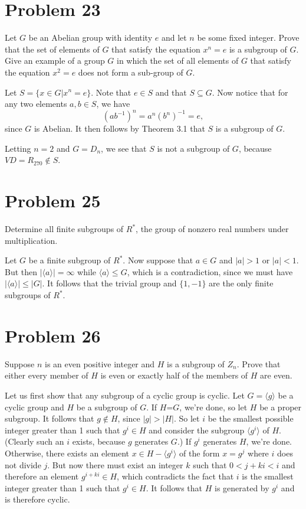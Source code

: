 \documentclass[12pt]{article}
\begin{document}
\section*{Problem 23}

Let $G$ be an Abelian group with identity $e$ and let $n$ be some fixed integer.
Prove that the set of elements of $G$ that satisfy the equation $x^n=e$
is a subgroup of $G$.  Give an example of a group $G$ in which the set
of all elements of $G$ that satisfy the equation $x^2=e$ does not form a sub-group of $G$.

Let $S=\{x\in G|x^n=e\}$.  Note that $e\in S$ and that $S\subseteq G$.
Now notice that for any two elements $a,b\in S$, we have
\begin{equation*}
(ab^{-1})^n = a^n(b^n)^{-1} = e,
\end{equation*}
since $G$ is Abelian.  It then follows by Theorem 3.1 that $S$ is a subgroup of $G$.

Letting $n=2$ and $G=D_n$, we see that $S$ is not a subgroup of $G$,
because $VD=R_{270}\not\in S$.

\section*{Problem 25}

Determine all finite subgroups of $R^*$, the group of nonzero real numbers under multiplication.

Let $G$ be a finite subgroup of $R^*$.  Now suppose that $a\in G$ and $|a|>1$ or $|a|<1$.
But then $|\langle a\rangle|=\infty$ while $\langle a\rangle\leq G$, which is a contradiction,
since we must have $|\langle a\rangle|\leq|G|$.
It follows that the trivial group and $\{1,-1\}$ are the only finite subgroups of $R^*$.

\section*{Problem 26}

Suppose $n$ is an even positive integer and $H$ is a subgroup of $Z_n$.  Prove
that either every member of $H$ is even or exactly half of the members of $H$ are even.

Let us first show that any subgroup of a cyclic group is cyclic.
Let $G=\langle g\rangle$ be a cyclic group and $H$ be a subgroup
of $G$.  If $H$=$G$, we're done, so let $H$ be a proper subgroup.
It follows that $g\not\in H$, since $|g|>|H|$.
So let $i$ be the smallest possible integer greater than 1 such that
$g^i\in H$ and consider the subgroup $\langle g^i\rangle$ of $H$.
(Clearly such an $i$ exists, because $g$ generates $G$.)
If $g^i$ generates $H$, we're done.  Otherwise, there exists
an element $x\in H-\langle g^i\rangle$ of the form $x=g^j$ where $i$
does not divide $j$.  But now there must exist an integer $k$
such that $0<j+ki<i$ and therefore an element $g^{i+ki}\in H$,
which contradicts the fact that $i$ is the smallest integer greater than 1
such that $g^i\in H$.  It follows that $H$ is generated by $g^i$ and
is therefore cyclic.
\end{document}
